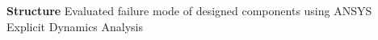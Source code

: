 \begin{cventries}
{\begin{cvitems}
			\item {\textbf{Structure} Evaluated failure mode of designed components using ANSYS Explicit Dynamics Analysis}
		\end{cvitems}
	}
\end{cventries}



